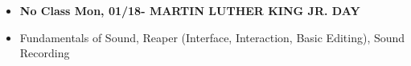 \def\dMon{Mon, 01/18}
\def\dTues{Tues, 01/19}
\def\dWed{Wed, 01/20}
\def\dThur{Thur, 01/21}
\def\dFri{Fri, 01/22}
\def\dSat{Sat, 01/23}
\def\dSun{Sun, 01/24}
\placeDate

\begin{itemize}[noitemsep,topsep=0pt,leftmargin=*]
	\item \textcolor{defaultColor}{\textbf{No Class \dMon - MARTIN LUTHER KING JR. DAY}}

	  \item {} Fundamentals of Sound, Reaper (Interface, Interaction, Basic Editing), Sound Recording

\end{itemize}
